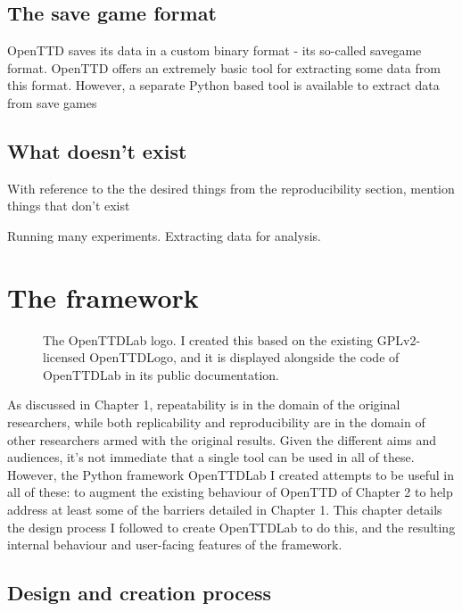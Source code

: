 \documentclass[logo,msc,dsti]{infthesis}    %
\begin{document}
\section{The save game format}

OpenTTD saves its data in a custom binary format - its so-called savegame format. OpenTTD offers an extremely basic tool for extracting some data from this format. However, a separate Python based tool is available to extract data from save games

\section{What doesn't exist}

\begin{itemize}
\begin{item}
With reference to the the desired things from the reproducibility section, mention things that don't exist
\end{item}
\end{itemize}

Running many experiments. Extracting data for analysis.

\chapter{The framework}

\begin{figure}[h]
\centering

\caption{The OpenTTDLab logo. I created this based on the existing GPLv2-licensed OpenTTDLogo, and it is displayed alongside the code of OpenTTDLab in its public documentation.}
\label{fig:openttlab-logo}
\end{figure}

As discussed in Chapter 1, repeatability is in the domain of the original researchers, while both replicability and reproducibility are in the domain of other researchers armed with the original results. Given the different aims and audiences, it's not immediate that a single tool can be used in all of these. However, the Python framework OpenTTDLab I created attempts to be useful in all of these: to augment the existing behaviour of OpenTTD of Chapter 2 to help address at least some of the barriers detailed in Chapter 1. This chapter details the design process I followed to create OpenTTDLab to do this, and the resulting internal behaviour and user-facing features of the framework.

\section{Design and creation process}
\end{document}
